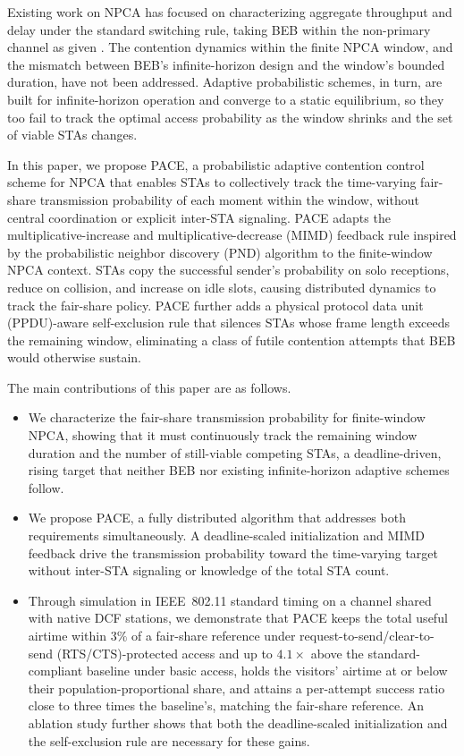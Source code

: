 \documentclass[journal,10pt]{IEEEtran}
\begin{document}
Existing work on NPCA has focused on characterizing aggregate throughput and delay under the standard switching rule, taking BEB within the non-primary channel as given \cite{wei2024non,bellalta2025performance,wei2024optimized}. The contention dynamics within the finite NPCA window, and the mismatch between BEB's infinite-horizon design and the window's bounded duration, have not been addressed. Adaptive probabilistic schemes, in turn, are built for infinite-horizon operation and converge to a static equilibrium, so they too fail to track the optimal access probability as the window shrinks and the set of viable STAs changes.

In this paper, we propose PACE, a probabilistic adaptive contention control scheme for NPCA that enables STAs to collectively track the time-varying fair-share transmission probability of each moment within the window, without central coordination or explicit inter-STA signaling. PACE adapts the multiplicative-increase and multiplicative-decrease (MIMD) feedback rule inspired by the probabilistic neighbor discovery (PND) algorithm \cite{song2014pnd} to the finite-window NPCA context. STAs copy the successful sender's probability on solo receptions, reduce on collision, and increase on idle slots, causing distributed dynamics to track the fair-share policy. PACE further adds a physical protocol data unit (PPDU)-aware self-exclusion rule that silences STAs whose frame length exceeds the remaining window, eliminating a class of futile contention attempts that BEB would otherwise sustain.

The main contributions of this paper are as follows.

\begin{itemize}
  \item We characterize the fair-share transmission probability for finite-window NPCA, showing that it must continuously track the remaining window duration and the number of still-viable competing STAs, a deadline-driven, rising target that neither BEB nor existing infinite-horizon adaptive schemes follow.
  \item We propose PACE, a fully distributed algorithm that addresses both requirements simultaneously. A deadline-scaled initialization and MIMD feedback drive the transmission probability toward the time-varying target without inter-STA signaling or knowledge of the total STA count.
  \item Through simulation in IEEE~802.11 standard timing on a channel shared with native DCF stations, we demonstrate that PACE keeps the total useful airtime within $3\%$ of a fair-share reference under request-to-send/clear-to-send (RTS/CTS)-protected access and up to $4.1\times$ above the standard-compliant baseline under basic access, holds the visitors' airtime at or below their population-proportional share, and attains a per-attempt success ratio close to three times the baseline's, matching the fair-share reference. An ablation study further shows that both the deadline-scaled initialization and the self-exclusion rule are necessary for these gains.
\end{itemize}
\end{document}
